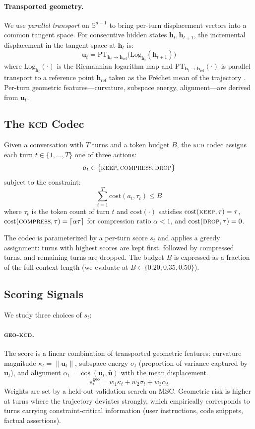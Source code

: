 \documentclass[11pt]{article}
\newcommand{\kcd}{\textsc{kcd}}
\newcommand{\geokcd}{\textsc{geo-kcd}}
\newcommand{\hv}{\mathbf{h}}
\newcommand{\uv}{\mathbf{u}}
\newcommand{\Sph}{\mathbb{S}}
\newcommand{\PT}{\mathrm{PT}}
\newcommand{\Log}{\mathrm{Log}}
\begin{document}
\paragraph{Transported geometry.}
We use \emph{parallel transport} on $\Sph^{d-1}$ to bring per-turn
displacement vectors into a common tangent space.
For consecutive hidden states $\hv_t, \hv_{t+1}$, the incremental
displacement in the tangent space at $\hv_t$ is:
\[
\uv_t = \PT_{\hv_t \to \hv_{\text{ref}}}\bigl(\Log_{\hv_t}(\hv_{t+1})\bigr)
\]
where $\Log_{\hv_t}(\cdot)$ is the Riemannian logarithm map and
$\PT_{\hv_t \to \hv_{\text{ref}}}(\cdot)$ is parallel transport to
a reference point $\hv_{\text{ref}}$ taken as the Fr\'{e}chet mean
of the trajectory \citep{afsari-2011-riemannian}.
Per-turn geometric features---curvature, subspace energy, alignment---are
derived from $\uv_t$.

\subsection{The \kcd{} Codec}
\label{sec:codec}

Given a conversation with $T$ turns and a token budget $B$,
the \kcd{} codec assigns each turn $t \in \{1, \ldots, T\}$ one of three actions:
\[
a_t \in \{\textsc{keep}, \textsc{compress}, \textsc{drop}\}
\]
subject to the constraint:
\[
\sum_{t=1}^T \mathrm{cost}(a_t, \tau_t) \leq B
\]
where $\tau_t$ is the token count of turn $t$ and $\mathrm{cost}(\cdot)$ satisfies
$\mathrm{cost}(\textsc{keep}, \tau) = \tau$,
$\mathrm{cost}(\textsc{compress}, \tau) = \lceil \alpha \tau \rceil$ for compression ratio $\alpha < 1$,
and $\mathrm{cost}(\textsc{drop}, \tau) = 0$.

The codec is parameterized by a per-turn score $s_t$ and applies a
greedy assignment: turns with highest scores are kept first, followed by
compressed turns, and remaining turns are dropped.
The budget $B$ is expressed as a fraction of the full context length
(we evaluate at $B \in \{0.20, 0.35, 0.50\}$).

\subsection{Scoring Signals}
\label{sec:signals}

We study three choices of $s_t$:

\paragraph{\geokcd{}.}
The score is a linear combination of transported geometric features:
curvature magnitude $\kappa_t = \|\uv_t\|$,
subspace energy $\sigma_t$ (proportion of variance captured by $\uv_t$),
and alignment $\alpha_t = \cos(\uv_t, \bar{\uv})$ with the mean displacement.
\[
s_t^{\text{geo}} = w_1 \kappa_t + w_2 \sigma_t + w_3 \alpha_t
\]
Weights are set by a held-out validation search on MSC.
Geometric risk is higher at turns where the trajectory deviates strongly,
which empirically corresponds to turns carrying constraint-critical information
(user instructions, code snippets, factual assertions).
\end{document}

